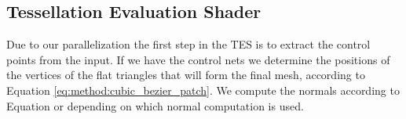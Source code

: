 \subsection{Tessellation Evaluation Shader}
\label{ss:implementation:tes}
	Due to our parallelization the first step in the TES is to extract the control points from the input. 
	If we have the control nets we determine the positions of the vertices of the flat triangles that will form the final mesh, according to Equation \eqref{eq:method:cubic_bezier_patch}. 
	We compute the normals according to Equation  or  depending on which normal computation is used. 